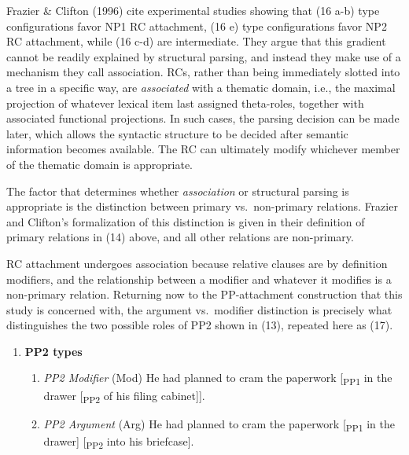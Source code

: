 \documentclass[11pt,oneside]{book}
\providecommand{\tightlist}{%
  \setlength{\itemsep}{0pt}\setlength{\parskip}{0pt}}
\begin{document}
Frazier \& Clifton (1996) cite experimental studies showing that (16 a-b) type configurations favor NP1 RC attachment, (16 e) type configurations favor NP2 RC attachment, while (16 c-d) are intermediate. They argue that this gradient cannot be readily explained by structural parsing, and instead they make use of a mechanism they call association. RCs, rather than being immediately slotted into a tree in a specific way, are \emph{associated} with a thematic domain, i.e., the maximal projection of whatever lexical item last assigned theta-roles, together with associated functional projections. In such cases, the parsing decision can be made later, which allows the syntactic structure to be decided after semantic information becomes available. The RC can ultimately modify whichever member of the thematic domain is appropriate.

The factor that determines whether \emph{association} or structural parsing is appropriate is the distinction between primary vs.~non-primary relations. Frazier and Clifton's formalization of this distinction is given in their definition of primary relations in (14) above, and all other relations are non-primary.

RC attachment undergoes association because relative clauses are by definition modifiers, and the relationship between a modifier and whatever it modifies is a non-primary relation. Returning now to the PP-attachment construction that this study is concerned with, the argument vs.~modifier distinction is precisely what distinguishes the two possible roles of PP2 shown in (13), repeated here as (17).

\begin{enumerate}
\def\labelenumi{(\arabic{enumi})}
\setcounter{enumi}{16}
\tightlist
\item
  \textbf{PP2 types}

  \begin{enumerate}
  \def\labelenumii{\alph{enumii}.}
  \tightlist
  \item
    \emph{PP2 Modifier} (Mod)
    He had planned to cram the paperwork {[}\textsubscript{PP1} in the drawer {[}\textsubscript{PP2} of his filing cabinet{]}{]}.
  \item
    \emph{PP2 Argument} (Arg)
    He had planned to cram the paperwork {[}\textsubscript{PP1} in the drawer{]} {[}\textsubscript{PP2} into his briefcase{]}.
  \end{enumerate}
\end{enumerate}
\end{document}
